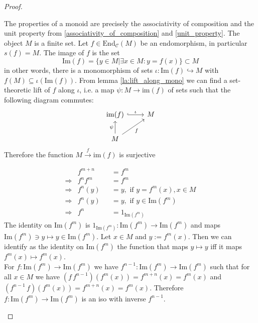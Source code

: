 \begin{proof}[Proof\nopunct]
\begin{subproof}[of (1)]
The properties of a monoid are precisely the associativity of composition and the unit property from \ref{associativity_of_composition} and
\ref{unit_property}.
The object $M$ is a finite set. Let $f \in \mathrm{End}_{\mathcal{C}}(M)$ be an endomorphism, in particular $s(f) = M$. The image of $f$ is the set 
\[
\mathrm{Im}(f) = \{ y \in M | \exists x \in M : y = f(x)\} \subset M
\]
in other words, there is a monomorphism of sets $\iota : \mathrm{Im}(f) \hookrightarrow M$ with $f(M) \subseteq \iota(\mathrm{Im}(f))$.
From lemma \ref{la:lift_along_mono} we can find a set-theoretic lift of $f$ along $\iota$, i.e. a map $\psi : M \rightarrow \mathrm{im}(f)$ of sets
such that the following diagram commutes:
\[
\begin{tikzcd}
\mathrm{im}(f) \arrow[r, "\iota", hook] & M \\
M \arrow[ru, "f"'] \arrow[u, "\psi"]    &  
\end{tikzcd}
\]
Therefore the function $M \xrightarrow{f} \mathrm{im}(f)$ is surjective
\end{subproof}
\begin{subproof}[Proof of (2).]
\begin{align*}
&f^{m+n} &&= f^{m} \\
\Rightarrow &f^{n}f^{m} &&= f^{m} \\
\Rightarrow &f^{n}(y) &&= y, \text{ if } y = f^{m}(x), x \in M \\
\Rightarrow &f^{n}(y) &&= y, \text{ if } y \in \mathrm{Im}(f^{m}) \\
\Rightarrow &f^{n} &&= 1_{\mathrm{Im}(f^{m})}
\end{align*}
The identity on $\mathrm{Im}(f^{m})$ is $1_{\mathrm{Im}(f^{m})} : \mathrm{Im}(f^{m}) \rightarrow \mathrm{Im}(f^{m})$
and maps $\mathrm{Im}(f^{m})\ni y \mapsto y \in \mathrm{Im}(f^{m})$.
Let $x \in M$ and $y := f^{m}(x)$. Then we can identify as the identity on $\mathrm{Im}(f^{m})$ the function
that maps $y \mapsto y$ iff it maps $f^{m}(x) \mapsto f^{m}(x)$.\\
For $f : \mathrm{Im}(f^{m}) \rightarrow \mathrm{Im}(f^{m})$ we have
$f^{n-1} : \mathrm{Im}(f^{m}) \rightarrow \mathrm{Im}(f^{m})$ such that for all
$x \in M$ we have $(f\,f^{n-1})(f^{m}(x)) = f^{m+n}(x) = f^{m}(x)$ and
$(f^{n-1}\,f)(f^{m}(x)) = f^{m+n}(x) = f^{m}(x)$. Therefore $f : \mathrm{Im}(f^{m}) \rightarrow \mathrm{Im}(f^{m})$
is an iso with inverse $f^{n-1}$.
\end{subproof}

\end{proof}
